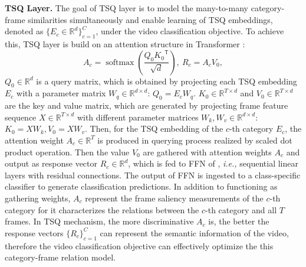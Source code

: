 \documentclass[runningheads]{llncs}
\begin{document}
\noindent\textbf{TSQ Layer.}
The goal of TSQ layer is to model the many-to-many category-frame similarities simultaneously and enable learning of TSQ embeddings, denoted as $\{E_c \in \mathbb{R}^{d}\}_{c=1}^C$, under the video classification objective. To achieve this, TSQ layer is build on an attention structure in Transformer \cite{transformer}:
\begin{equation}
A_c = \operatorname{softmax}(\frac{Q_0 {K_0}^{\mathsf{T}}} {\sqrt{ d}}),~R_c=A_cV_0 ,
\end{equation}
$Q_0\in \mathbb{R}^{d}$ is a query matrix, which is obtained by projecting each TSQ embedding $E_c$ with a parameter matrix $W_q \in \mathbb{R}^{d\times d}$: $Q_0 = E_cW_q$.
$K_0\in \mathbb{R}^{T \times d}$ and $V_0\in \mathbb{R}^{T \times d}$ are the key and value matrix, which are generated by projecting frame feature sequence $X\in \mathbb{R}^{T\times d}$ with different parameter matrices $W_k, W_v \in \mathbb{R}^{d\times d}$: $K_0=XW_k, V_0=XW_v$.
Then, for the TSQ embedding of the $c$-th category $E_c$, the attention weight $A_c \in \mathbb{R}^{T}$ is produced in querying process realized by scaled dot product operation. Then the value $V_0$ are gathered with attention weights $A_c$ and output as response vector $R_c\in \mathbb{R}^d$, which is fed to FFN of \cite{transformer}, \emph{i.e.,} sequential linear layers with residual connections. The output of FFN is ingested to a class-specific classifier to generate classification predictions. In addition to functioning as gathering weights, $A_c$ represent the frame saliency measurements of the $c$-th category for it characterizes the relations between the $c$-th category and all $T$ frames. In TSQ mechanism, the more discriminative $A_c$ is, the better the response vectors $\{R_c\}_{c=1}^C$ can represent the semantic information of the video, therefore the video classification objective can effectively optimize the this category-frame relation model.
\end{document}
